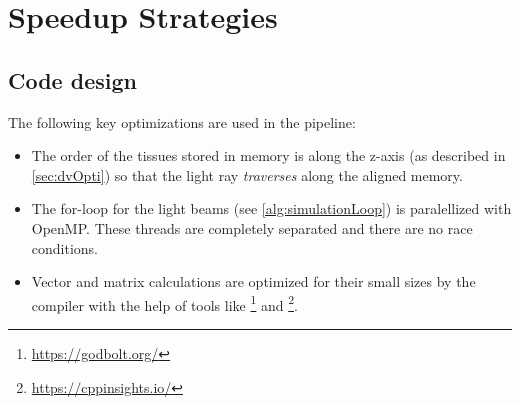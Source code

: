 \section{Speedup Strategies}\label{sec:sim:opt}
%
\subsection{Code design}
% 
The following key optimizations are used in the pipeline:
\begin{itemize}
    \item The order of the tissues stored in memory is along the z-axis (as described in \cref{sec:dvOpti}) so that the light ray \textit{traverses} along the aligned memory.
    \item The for-loop for the light beams (see \cref{alg:simulationLoop}) is paralellized with \ac{OpenMP}.
    These threads are completely separated and there are no race conditions.
    \item Vector and matrix calculations are optimized for their small sizes by the compiler with the help of tools like \footnote{\url{https://godbolt.org/}} and \footnote{\url{https://cppinsights.io/}}.
\end{itemize}
%
%
% 
